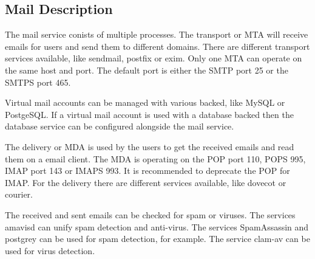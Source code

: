 \subsection{Mail Description}

The mail service conists of multiple processes. The transport or MTA
will receive emails for users and send them to different domains.
There are different transport services available, like
sendmail\cite{sendmail}, postfix\cite{postfix} or exim\cite{exim}.
Only one MTA can operate on the same host and port. The default port
is either the SMTP port 25 or the SMTPS port 465.

Virtual mail accounts can be managed with various backed, like MySQL or
PostgeSQL. If a virtual mail account is used with a database backed then
the database  service can be configured alongside the mail service.

The delivery or MDA is used by the users to get the received emails and read
them on a email client. The MDA is operating on the POP port 110, POPS 995, IMAP
port 143 or IMAPS 993. It is recommended to deprecate the POP for IMAP.
For the delivery there are different services available, like
dovecot\cite{dovecot} or courier\cite{courier}.

The received and sent emails can be checked for spam or viruses.
The services amavisd\cite{amavisd} can unify spam detection and anti-virus.
The services SpamAssassin\cite{SpamAssassin} and postgrey\cite{postgrey}
can be used for spam detection, for example. 
The service clam-av\cite{clam-av} can be used
for virus detection.
